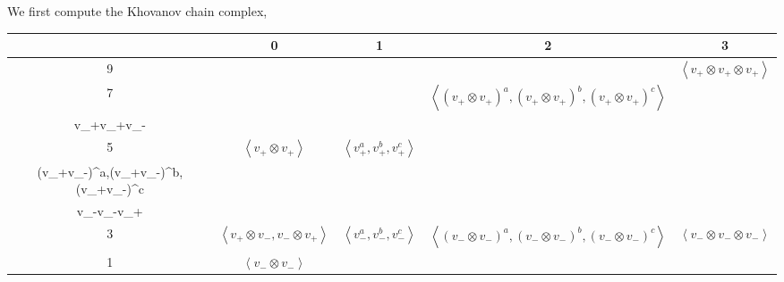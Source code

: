 \documentclass[11pt]{article}
\theoremstyle{definition}
\newcommand{\gen}[1]{\left\langle #1 \right\rangle}
\begin{document}
    We first compute the Khovanov chain complex,
    \begin{center}
        \begin{tabular}{|c|c|c|c|c|}
            &0&1&2&3 \\
            \hline
            9&& & &\(\gen{v_+\otimes v_+\otimes v_+}\)\\
            \hline
            7& &&\(\gen{(v_+\otimes v_+)^a,(v_+\otimes v_+)^b,(v_+\otimes v_+)^c}\)&\(\gen{\substack{v_-\otimes v_+\otimes v_+, v_+\otimes v_-\otimes v_+, \\ v_+\otimes v_+\otimes v_-}}\)\\
            \hline
            5&\(\gen{v_+\otimes v_+}\)&\(\gen{v_+^a,v_+^b,v_+^c}\)&\(\gen{\substack{(v_-\otimes v_+)^a,(v_-\otimes v_+)^b,(v_-\otimes v_+)^c, \\(v_+\otimes v_-)^a,(v_+\otimes v_-)^b,(v_+\otimes v_-)^c}}\)&\(\gen{\substack{v_+\otimes v_-\otimes v_-, v_-\otimes v_+\otimes v_-, \\ v_-\otimes v_-\otimes v_+}}\)\\
            \hline
            3&\(\gen{v_+\otimes v_-, v_- \otimes v_+}\)&\(\gen{v_-^a,v_-^b,v_-^c}\)&\(\gen{(v_-\otimes v_-)^a,(v_-\otimes v_-)^b,(v_-\otimes v_-)^c}\)&\(\gen{v_-\otimes v_-\otimes v_-}\)\\
            \hline
            1&\(\gen{v_-\otimes v_-}\)& & & \\
            \hline
        \end{tabular}
    \end{center}
\end{document}
